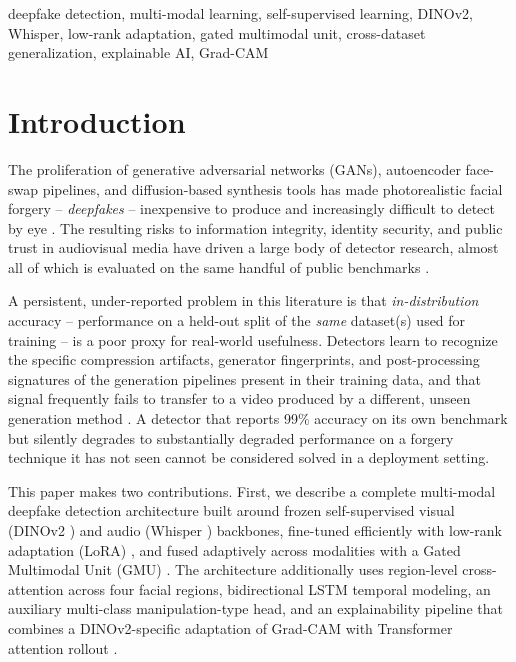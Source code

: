 \documentclass[conference]{IEEEtran}
\begin{document}
\begin{IEEEkeywords}
deepfake detection, multi-modal learning, self-supervised learning, DINOv2,
Whisper, low-rank adaptation, gated multimodal unit, cross-dataset
generalization, explainable AI, Grad-CAM
\end{IEEEkeywords}

\section{Introduction}

The proliferation of generative adversarial networks (GANs), autoencoder
face-swap pipelines, and diffusion-based synthesis tools has made
photorealistic facial forgery -- \textit{deepfakes} -- inexpensive to produce
and increasingly difficult to detect by eye \cite{tolosana2020survey}. The
resulting risks to information integrity, identity security, and public
trust in audiovisual media have driven a large body of detector research,
almost all of which is evaluated on the same handful of public benchmarks
\cite{rossler2019faceforensics, dolhansky2020dfdc, khalid2021fakeavceleb}.

A persistent, under-reported problem in this literature is that
\textit{in-distribution} accuracy -- performance on a held-out split of the
\emph{same} dataset(s) used for training -- is a poor proxy for real-world
usefulness. Detectors learn to recognize the specific compression artifacts,
generator fingerprints, and post-processing signatures of the generation
pipelines present in their training data, and that signal frequently fails
to transfer to a video produced by a different, unseen generation method
\cite{tolosana2020survey, wang2020cnn, cozzolino2018forensictransfer}. A
detector that reports 99\% accuracy on its own benchmark but silently
degrades to substantially degraded performance on a forgery technique it has not seen
cannot be considered solved in a deployment setting.

This paper makes two contributions. First, we describe a complete
multi-modal deepfake detection architecture built around frozen
self-supervised visual (DINOv2 \cite{oquab2023dinov2}) and audio (Whisper
\cite{radford2023whisper}) backbones, fine-tuned efficiently with low-rank
adaptation (LoRA) \cite{hu2022lora}, and fused adaptively across modalities
with a Gated Multimodal Unit (GMU) \cite{arevalo2017gmu}. The architecture
additionally uses region-level cross-attention across four facial regions,
bidirectional LSTM temporal modeling, an auxiliary multi-class
manipulation-type head, and an explainability pipeline that combines a
DINOv2-specific adaptation of Grad-CAM \cite{selvaraju2017gradcam} with
Transformer attention rollout \cite{abnar2020rollout}.
\end{document}
